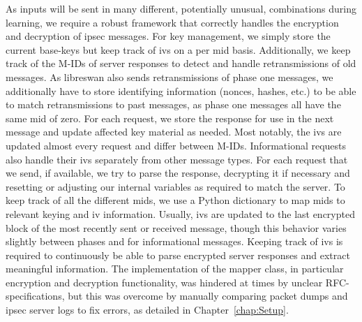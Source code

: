 As inputs will be sent in many different, potentially unusual, combinations during learning, we require a robust framework that correctly handles the encryption and decryption of \ac{ipsec} messages. For key management, we simply store the current base-keys but keep track of \acp{iv} on a per \ac{mid} basis. Additionally, we keep track of the M-IDs of server responses to detect and handle retransmissions of old messages. As libreswan also sends retransmissions of phase one messages, we additionally have to store identifying information (nonces, hashes, etc.) to be able to match retransmissions to past messages, as phase one messages all have the same \ac{mid} of zero.
For each request, we store the response for use in the next message and update affected key material as needed. Most notably, the \acp{iv} are updated almost every request and differ between M-IDs. Informational requests also handle their \acp{iv} separately from other message types. For each request that we send, if available, we try to parse the response, decrypting it if necessary and resetting or adjusting our internal variables as required to match the server. To keep track of all the different \acp{mid}, we use a Python dictionary to map \acp{mid} to relevant keying and \ac{iv} information. Usually, \acp{iv} are updated to the last encrypted block of the most recently sent or received message, though this behavior varies slightly between phases and for informational messages. Keeping track of \acp{iv} is required to continuously be able to parse encrypted server responses and extract meaningful information. The implementation of the mapper class, in particular encryption and decryption functionality, was hindered at times by unclear RFC-specifications, but this was overcome by manually comparing packet dumps and \ac{ipsec} server logs to fix errors, as detailed in Chapter~\ref{chap:Setup}.\\

